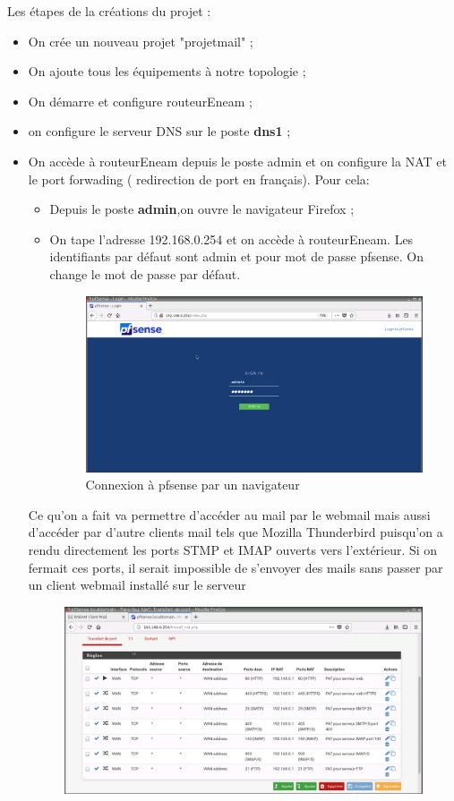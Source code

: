 \documentclass[a4paper,12pt,french]{report} %
\begin{document}
Les étapes de la créations du projet :
\begin{itemize}
\item On crée un nouveau projet "projetmail" ;
\item On ajoute tous les équipements à notre topologie ;
\item On démarre et configure routeurEneam ;
\item on configure le serveur DNS sur le poste \textbf{dns1} ;
\item On accède à routeurEneam depuis le poste admin et on configure la NAT et le port forwading ( redirection de port en français). Pour cela:
	\begin{itemize}
	\item Depuis le poste \textbf{admin},on ouvre le navigateur Firefox ;
	\item On tape l'adresse 192.168.0.254 et on accède à routeurEneam. Les identifiants par défaut sont admin et pour mot de passe pfsense. On change le mot de passe par défaut.
	\begin{figure}[H]
	\centering
	\includegraphics[width=483pt]{figure/pfsense_login.png}
	\caption{Connexion à pfsense par un navigateur}	
	\end{figure}	 	
	\end{itemize}
Ce qu'on a fait va permettre d'accéder au mail par le webmail mais aussi d'accéder par d'autre clients mail tels que Mozilla Thunderbird puisqu'on a rendu directement les ports STMP et IMAP ouverts vers l'extérieur. Si on fermait ces ports, il serait impossible de s'envoyer des mails sans passer par un client webmail installé sur le serveur
\begin{figure}[H]
\centering
\includegraphics[width=483pt]{figure/figure_routeurMail_configuration_pat.png}

\end{figure}
\end{itemize}
\end{document}

